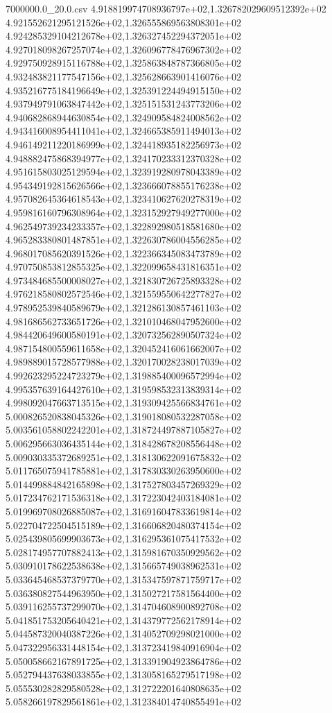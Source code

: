 \begin{filecontents*}{7000000.0_20.0.csv}
4.918819974708936797e+02,1.326782029609512392e+02
4.921552621295121526e+02,1.326555869563808301e+02
4.924285329104212678e+02,1.326327452294372051e+02
4.927018098267257074e+02,1.326096778476967302e+02
4.929750928915116788e+02,1.325863848787366805e+02
4.932483821177547156e+02,1.325628663901416076e+02
4.935216775184196649e+02,1.325391224494915150e+02
4.937949791063847442e+02,1.325151531243773206e+02
4.940682868944630854e+02,1.324909584824008562e+02
4.943416008954411041e+02,1.324665385911494013e+02
4.946149211220186999e+02,1.324418935182256973e+02
4.948882475868394977e+02,1.324170233312370328e+02
4.951615803025129594e+02,1.323919280978043389e+02
4.954349192815626566e+02,1.323666078855176238e+02
4.957082645364618543e+02,1.323410627620278319e+02
4.959816160796308964e+02,1.323152927949277000e+02
4.962549739234233357e+02,1.322892980518581680e+02
4.965283380801487851e+02,1.322630786004556285e+02
4.968017085620391526e+02,1.322366345083473789e+02
4.970750853812855325e+02,1.322099658431816351e+02
4.973484685500008027e+02,1.321830726725893328e+02
4.976218580802572546e+02,1.321559550642277827e+02
4.978952539840589679e+02,1.321286130857461103e+02
4.981686562733651726e+02,1.321010468047952600e+02
4.984420649600580191e+02,1.320732562890507324e+02
4.987154800559611658e+02,1.320452416061662007e+02
4.989889015728577988e+02,1.320170028238017039e+02
4.992623295224723279e+02,1.319885400096572994e+02
4.995357639164427610e+02,1.319598532313839314e+02
4.998092047663713515e+02,1.319309425566834761e+02
5.000826520838045326e+02,1.319018080532287058e+02
5.003561058802242201e+02,1.318724497887105827e+02
5.006295663036435144e+02,1.318428678208556448e+02
5.009030335372689251e+02,1.318130622091675832e+02
5.011765075941785881e+02,1.317830330263950600e+02
5.014499884842165898e+02,1.317527803457269329e+02
5.017234762171536318e+02,1.317223042403184081e+02
5.019969708026885087e+02,1.316916047833619814e+02
5.022704722504515189e+02,1.316606820480374154e+02
5.025439805699903673e+02,1.316295361075417532e+02
5.028174957707882413e+02,1.315981670350929562e+02
5.030910178622538638e+02,1.315665749038962531e+02
5.033645468537379770e+02,1.315347597871759717e+02
5.036380827544963950e+02,1.315027217581564400e+02
5.039116255737299070e+02,1.314704608900892708e+02
5.041851753205640421e+02,1.314379772562178914e+02
5.044587320040387226e+02,1.314052709298021000e+02
5.047322956331448154e+02,1.313723419840916904e+02
5.050058662167891725e+02,1.313391904923864786e+02
5.052794437638033855e+02,1.313058165279517198e+02
5.055530282829580528e+02,1.312722201640808635e+02
5.058266197829561861e+02,1.312384014740855491e+02

\end{filecontents*}
